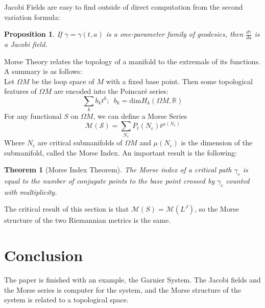 \documentclass[notitlepage]{article}
\newtheorem{thm}{Theorem}
\newtheorem{prop}{Proposition}
\begin{document}
Jacobi Fields are easy to find outside of direct computation from the second variation formula:

\begin{prop}
If $\gamma = \gamma(t,a)$ is a one-parameter family of geodesics, then $\frac{d \gamma}{da}$ is a Jacobi field.
\end{prop}

Morse Theory relates the topology of a manifold to the extremals of its functions. A summary is as follows: \\

\indent Let $\Omega M$ be the loop space of $M$ with a fixed base point. Then some topological features of $\Omega M$ are encoded into the Poincar\'e series:
\begin{equation}
    \sum_k b_k t^k; \hspace{6pt} b_k = \mathrm{dim}H_k(\Omega M, \mathbb{R})
\end{equation}
\indent For any functional $S$ on $\Omega M$, we can define a Morse Series 
\begin{equation}
    \mathcal{M(S)}=\sum_{N_c}P_t(N_c) t^{\mu(N_c)}
\end{equation}
Where $N_c$ are critical submanifolds of $\Omega M$ and $\mu(N_c)$ is the dimension of the submanifold, called the Morse Index. An important result is the following:
\begin{thm}[Morse Index Theorem]
The Morse index of a critical path $\gamma_c$ is equal to the number of conjugate points to the base point crossed by $\gamma_c$ counted with multiplicity.
\end{thm}

The critical result of this section is that $\mathcal{M}(S)=\mathcal{M}(L^J)$, so the Morse structure of the two Riemannian metrics is the same.

\section{Conclusion}
The paper is finished with an example, the Garnier System. The Jacobi fields and the Morse series is computer for the system, and the Morse structure of the system is related to a topological space.
\end{document}
